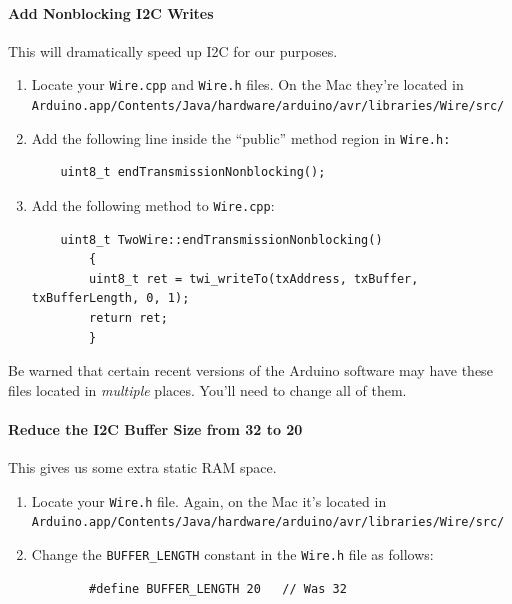 \documentclass{article}
\begin{document}
\begin{enumerate}
\paragraph{Add Nonblocking I2C Writes}  This will dramatically speed up I2C for our purposes.
\begin{enumerate}
\item Locate your \texttt{Wire.cpp} and \texttt{Wire.h} files.  On the Mac they're located in\\\texttt{Arduino.app/Contents/Java/hardware/arduino/avr/libraries/Wire/src/}

\item Add the following line inside the ``public'' method region in \texttt{Wire.h:}

\begin{verbatim}
    uint8_t endTransmissionNonblocking();
\end{verbatim}

\item Add the following method to \texttt{Wire.cpp}:

\begin{verbatim}
    uint8_t TwoWire::endTransmissionNonblocking()
        {
        uint8_t ret = twi_writeTo(txAddress, txBuffer, txBufferLength, 0, 1);
        return ret;
        }
\end{verbatim}
\end{enumerate}

Be warned that certain recent versions of the Arduino software may have these files located in {\it multiple} places.  You'll need to change all of them.

\paragraph{Reduce the I2C Buffer Size from 32 to 20} This gives us some extra static RAM space.

\begin{enumerate}
\item Locate your \texttt{Wire.h} file.  Again, on the Mac it's located in\\
\texttt{Arduino.app/Contents/Java/hardware/arduino/avr/libraries/Wire/src/}

\item Change the \texttt{BUFFER\_LENGTH} constant in the \texttt{Wire.h} file as follows:

\begin{verbatim}
        #define BUFFER_LENGTH 20   // Was 32
\end{verbatim}


\end{enumerate}
\end{enumerate}
\end{document}
